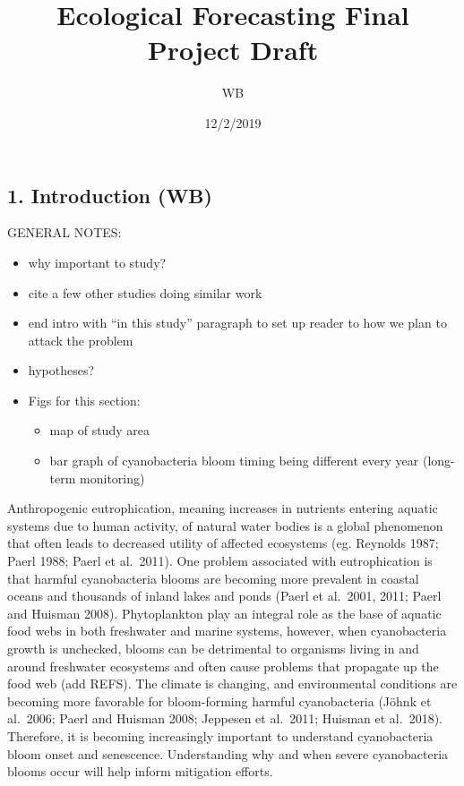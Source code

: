 \documentclass[]{article}
\title{Ecological Forecasting Final Project Draft}
\author{WB}
\date{12/2/2019}
\providecommand{\tightlist}{%
  \setlength{\itemsep}{0pt}\setlength{\parskip}{0pt}}
\begin{document}
\maketitle

\hypertarget{introduction-wb}{%
\subsection{1. Introduction (WB)}\label{introduction-wb}}

GENERAL NOTES:

\begin{itemize}
\tightlist
\item
  why important to study?
\item
  cite a few other studies doing similar work
\item
  end intro with ``in this study'' paragraph to set up reader to how we
  plan to attack the problem
\item
  hypotheses?
\item
  Figs for this section:

  \begin{itemize}
  \tightlist
  \item
    map of study area
  \item
    bar graph of cyanobacteria bloom timing being different every year
    (long-term monitoring)
  \end{itemize}
\end{itemize}

Anthropogenic eutrophication, meaning increases in nutrients entering
aquatic systems due to human activity, of natural water bodies is a
global phenomenon that often leads to decreased utility of affected
ecosystems (eg. Reynolds 1987; Paerl 1988; Paerl et al.~2011). One
problem associated with eutrophication is that harmful cyanobacteria
blooms are becoming more prevalent in coastal oceans and thousands of
inland lakes and ponds (Paerl et al.~2001, 2011; Paerl and Huisman
2008). Phytoplankton play an integral role as the base of aquatic food
webs in both freshwater and marine systems, however, when cyanobacteria
growth is unchecked, blooms can be detrimental to organisms living in
and around freshwater ecosystems and often cause problems that propagate
up the food web (add REFS). The climate is changing, and environmental
conditions are becoming more favorable for bloom-forming harmful
cyanobacteria (Jöhnk et al.~2006; Paerl and Huisman 2008; Jeppesen et
al.~2011; Huisman et al.~2018). Therefore, it is becoming increasingly
important to understand cyanobacteria bloom onset and senescence.
Understanding why and when severe cyanobacteria blooms occur will help
inform mitigation efforts.
\end{document}
